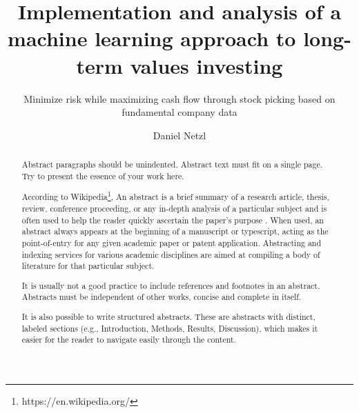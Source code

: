 \documentclass{imc-inf}
\title{Implementation and analysis of a machine learning approach to long-term values investing}
\subtitle{Minimize risk while maximizing cash flow through stock picking based on fundamental company data}
\author{Daniel Netzl}
\begin{document}
\frontmatter\maketitle{}


\begin{declarations}\end{declarations}



\begin{abstract}
	Abstract paragraphs should be unindented. Abstract text must fit on a single page. Try to present the essence of your work here. 
	
	According to Wikipedia\footnote{https://en.wikipedia.org/}, An abstract is a brief summary of a research article, thesis, review, conference proceeding, or any in-depth analysis of a particular subject and is often used to help the reader quickly ascertain the paper's purpose \cite{988366}. When used, an abstract always appears at the beginning of a manuscript or typescript, acting as the point-of-entry for any given academic paper or patent application. Abstracting and indexing services for various academic disciplines are aimed at compiling a body of literature for that particular subject.
	
	It is usually not a good practice to include references and footnotes in an abstract. Abstracts must be independent of other works, concise and complete in itself. 
	
	It is also possible to write structured abstracts. These are abstracts with distinct, labeled sections (e.g., Introduction, Methods, Results, Discussion), which makes it easier for the reader to navigate easily through the content. 
	
\end{abstract}


%
\tableofcontents%
\clearpage


%
\listoftables
\clearpage


%
\listoffigures
\clearpage


\mainmatter%
\end{document}

